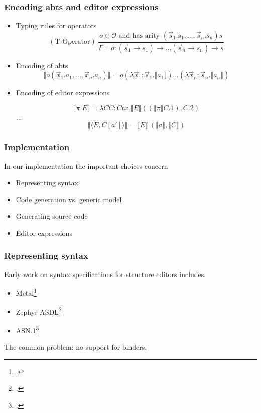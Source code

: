 \documentclass[t,24pt,serif,aspectratio=169]{beamer}
\newcommand{\enc}[1]{\llbracket #1 \rrbracket}
\newcommand{\conf}[2]{\langle #1,#2 \rangle}
\begin{document}
\begin{frame}[hvid]
    \frametitle{Encoding abts and editor expressions}
    \begin{itemize}
        \item Typing rules for operators
              \[
                  (\text{T-Operator}) \ \frac{o \in \mathcal{O} \text{ and has arity } (\Vec{s}_1.s_1,...,\Vec{s}_n.s_n)s}{\Gamma \vdash o : (\Vec{s}_1 \rightarrow s_1) \rightarrow ... (\Vec{s}_n \rightarrow s_n) \rightarrow s}
              \]
        \item Encoding of abts
              \[
                  \llbracket o(\Vec{x}_1.a_1,...,\Vec{x}_n.a_n) \rrbracket = o(\lambda \Vec{x}_1:\Vec{s}_1.\llbracket a_1 \rrbracket)...(\lambda \Vec{x}_n : \Vec{s}_n.\llbracket a_n \rrbracket)
              \]
        \item Encoding of editor expressions
              \begin{center}
                  \[
                      \llbracket \pi.E \rrbracket = \lambda CC : Ctx.\llbracket E \rrbracket ((\llbracket \pi \rrbracket C.1), C.2)
                  \]
                  ...
                  \[
                      \enc{\conf{E}{C[a']}} = \enc{E} \ (\enc{a}, \enc{C})
                  \]
              \end{center}
    \end{itemize}
\end{frame}




\begin{frame}[hvid]
  \frametitle{Implementation}

  In our implementation the important choices concern
  
    \begin{itemize}
        \item Representing syntax
        \item Code generation vs. generic model
        \item Generating source code
        \item Editor expressions
    \end{itemize}
\end{frame}


\begin{frame}
  \frametitle{Representing syntax}

  Early work on syntax specifications for structure editors includes
  
    \begin{itemize}
        \item Metal\footcite{metal}
              \pause
        \item Zephyr ASDL\footcite{zephyr}
              \pause
        \item ASN.1\footcite{asn1}
              \pause
            \end{itemize}

            The common problem: no support for binders.

\end{frame}
\end{document}
